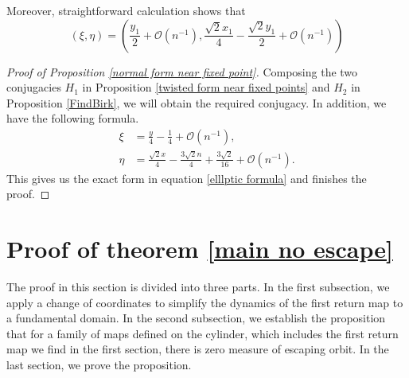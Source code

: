 \documentclass{article}
\numberwithin{figure}{section}
\numberwithin{equation}{section}
\theoremstyle{remark}
\theoremstyle{definition}
\begin{document}
Moreover, straightforward calculation shows that 
$$\left(\xi,\eta\right)=\left(\frac{y_1}{2}+\mathcal{O}(n^{-1}),\frac{\sqrt{2}x_1}{4}-\frac{\sqrt{2}y_1}{2}+\mathcal{O}(n^{-1})\right)$$
\begin{proof}[Proof of {\color{red}Proposition \ref{normal form near fixed point}}]
Composing the two conjugacies $H_1$ in Proposition \ref{twisted form near fixed points} and $H_2$ in Proposition \ref{FindBirk}, we will obtain the required conjugacy. In addition, we have the following formula.
	\begin{align*}
		\xi&=\frac{y}{4}-\frac{1}{4}+\mathcal{O}(n^{-1}),\\
		\eta&=\frac{\sqrt{2}x}{4}-\frac{3\sqrt{2}n}{4}+\frac{3\sqrt{2}}{16}+\mathcal{O}(n^{-1}).
    \end{align*}
	This gives us the exact form in equation \ref{elllptic formula} and finishes the proof.
\end{proof}

\section{Proof of theorem \ref{main no escape}}\label{Proof no escape}
The proof in this section is divided into three parts. In the first subsection, we apply a change of coordinates to simplify the dynamics of the first return map to a fundamental domain. In the second subsection, we establish the proposition that for a family of maps defined on the cylinder, which includes the first return map we find in the first section, there is zero measure of escaping orbit. In the last section, we prove the proposition.
\end{document}
